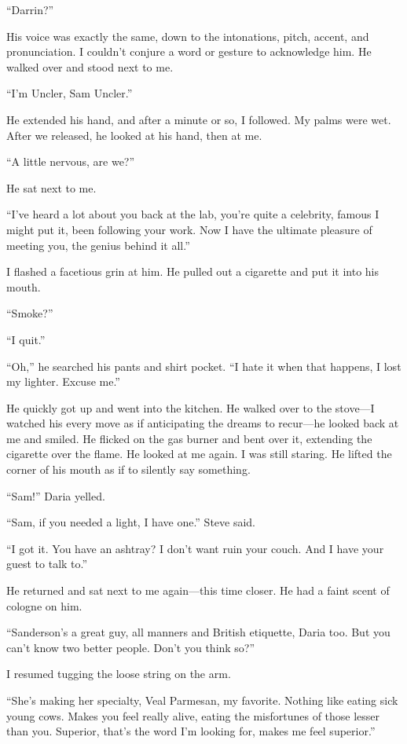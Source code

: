 \documentclass[
]{article}
\begin{document}
``Darrin?''

His voice was exactly the same, down to the intonations, pitch, accent,
and pronunciation. I couldn't conjure a word or gesture to acknowledge
him. He walked over and stood next to me.

``I'm Uncler, Sam Uncler.''

He extended his hand, and after a minute or so, I followed. My palms
were wet. After we released, he looked at his hand, then at me.

``A little nervous, are we?''

He sat next to me.

``I've heard a lot about you back at the lab, you're quite a celebrity,
famous I might put it, been following your work. Now I have the ultimate
pleasure of meeting you, the genius behind it all.''

I flashed a facetious grin at him. He pulled out a cigarette and put it
into his mouth.

``Smoke?''

``I quit.''

``Oh,'' he searched his pants and shirt pocket. ``I hate it when that
happens, I lost my lighter. Excuse me.''

He quickly got up and went into the kitchen. He walked over to the
stove---I watched his every move as if anticipating the dreams to
recur---he looked back at me and smiled. He flicked on the gas burner
and bent over it, extending the cigarette over the flame. He looked at
me again. I was still staring. He lifted the corner of his mouth as if
to silently say something.

``Sam!'' Daria yelled.

``Sam, if you needed a light, I have one.'' Steve said.

``I got it. You have an ashtray? I don't want ruin your couch. And I
have your guest to talk to.''

He returned and sat next to me again---this time closer. He had a faint
scent of cologne on him.

``Sanderson's a great guy, all manners and British etiquette, Daria too.
But you can't know two better people. Don't you think so?''

I resumed tugging the loose string on the arm.

``She's making her specialty, Veal Parmesan, my favorite. Nothing like
eating sick young cows. Makes you feel really alive, eating the
misfortunes of those lesser than you. Superior, that's the word I'm
looking for, makes me feel superior.''
\end{document}
